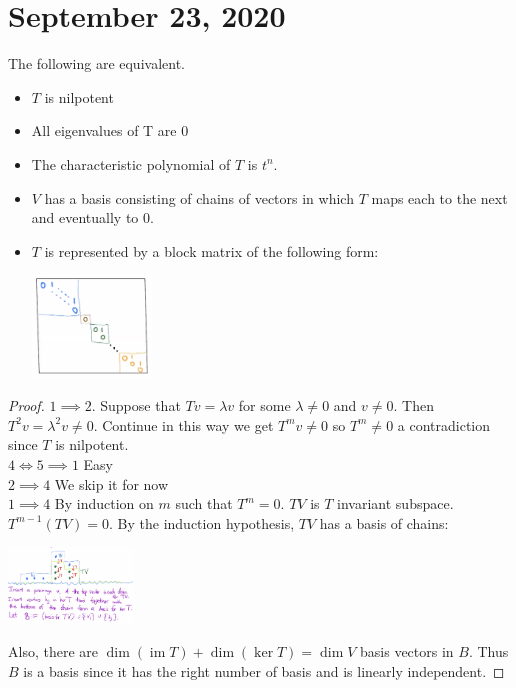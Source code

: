 \documentclass{article}
\DeclareMathOperator{\im}{im}
\begin{document}
\section{September 23, 2020}
\begin{proposition}
The following are equivalent.
\begin{itemize}
    \item $T$ is nilpotent
    \item All eigenvalues of T are 0
    \item The characteristic polynomial of $T$ is $t^n$.
    \item $V$ has a basis consisting of chains of vectors in which $T$ maps each to the next and eventually to 0.
    \item $T$ is represented by a block matrix of the following form:
    \begin{center}
        \includegraphics[width=0.25\textwidth]{Image 2 9232020.PNG}
    \end{center}
\end{itemize}
\end{proposition}
\begin{proof}
$1\implies 2$. Suppose that $Tv=\lambda v$ for some $\lambda\neq 0$ and $v\neq 0$. Then $T^2 v=\lambda^2 v\neq 0$. Continue in this way we get $T^m v\neq 0$ so $T^m\neq 0$ a contradiction since $T$ is nilpotent. 
\\
$4\iff 5\implies 1$ Easy
\\
$2\implies 4$ We skip it for now
\\
$1\implies 4$ By induction on $m$ such that $T^m=0$. $TV$ is $T$ invariant subspace. $T^{m-1}(TV)=0$. By the induction hypothesis, $TV$ has a basis of chains:
\begin{center}
   \includegraphics[width=0.25\textwidth]{Image 1 9232020.PNG}
\end{center}
Also, there are $\dim(\im T)+\dim(\ker T)=\dim V$ basis vectors in $B$. Thus $B$ is a basis since it has the right number of basis and is linearly independent.  
\end{proof}
\end{document}
